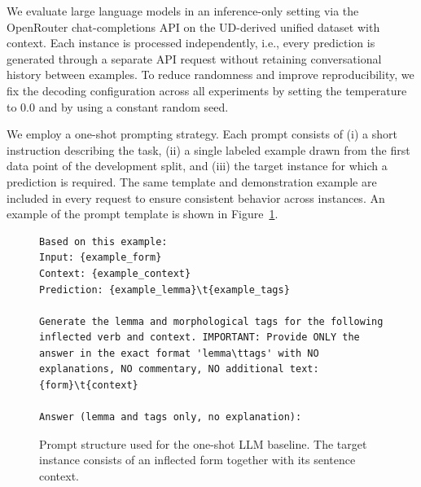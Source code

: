 We evaluate large language models in an inference-only setting via the OpenRouter chat-completions API on the \ac{UD}-derived unified dataset with context. Each instance is processed independently, i.e., every prediction is generated through a separate API request without retaining conversational history between examples. To reduce randomness and improve reproducibility, we fix the decoding configuration across all experiments by setting the temperature to $0.0$ and by using a constant random seed.

We employ a one-shot prompting strategy. Each prompt consists of (i) a short instruction describing the task, (ii) a single labeled example drawn from the first data point of the development split, and (iii) the target instance for which a prediction is required. The same template and demonstration example are included in every request to ensure consistent behavior across instances. An example of the prompt template is shown in Figure~\ref{fig:llm_prompt}.

\begin{figure}[h]
\centering
\begin{tcolorbox}[width=0.9\linewidth]
\begin{lstlisting}[basicstyle=\footnotesize\ttfamily,breaklines=true,breakatwhitespace=true,breakindent=0pt,breakautoindent=false,postbreak=\mbox{}]
Based on this example:
Input: {example_form}
Context: {example_context}
Prediction: {example_lemma}\t{example_tags}

Generate the lemma and morphological tags for the following inflected verb and context. IMPORTANT: Provide ONLY the answer in the exact format 'lemma\ttags' with NO explanations, NO commentary, NO additional text: {form}\t{context}

Answer (lemma and tags only, no explanation):
\end{lstlisting}
\end{tcolorbox}
\caption{Prompt structure used for the one-shot LLM baseline. The target instance consists of an inflected form together with its sentence context.}
\label{fig:llm_prompt}
\end{figure}